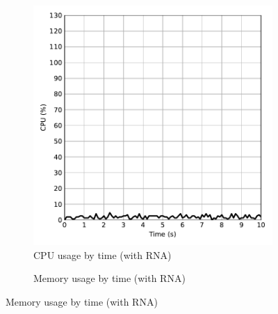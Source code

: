 



\begin{figure}[htb]
    \caption{Performance evaluation with RNA}
    \begin{subfigure}{.5\textwidth}
        \centering
        \vspace{1em}
        \caption{CPU usage by time (with RNA)}
        \includegraphics[width=1.0\textwidth]{images/cpu_with_rna.pdf}
    \end{subfigure}%
    \begin{subfigure}{.5\textwidth}
        \centering
        \vspace{1em}
        \caption{Memory usage by time (with RNA)}

\end{subfigure}
\end{figure}
